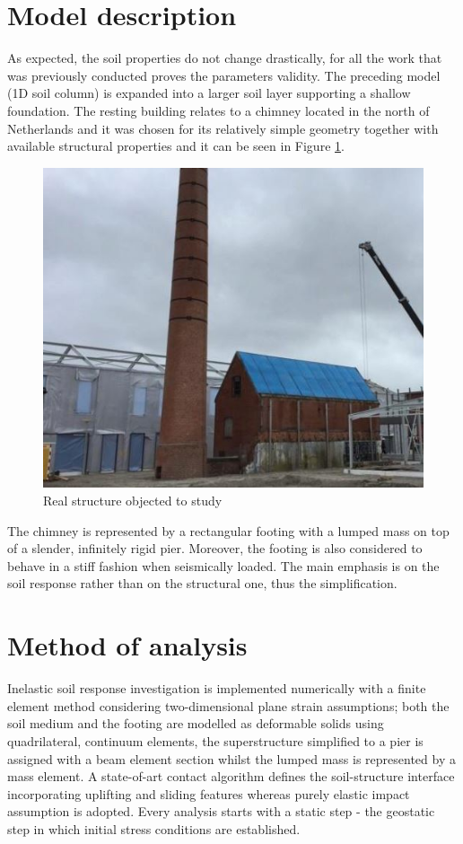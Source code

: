 	\section{Model description}
	As expected, the soil properties do not change drastically, for all the work that was previously conducted proves the parameters validity. The preceding model (1D soil column) is expanded into a larger soil layer supporting a shallow foundation. The resting building relates to a chimney located in the north of Netherlands and it was chosen for its relatively simple geometry together with available structural properties and it can be seen in Figure \ref{chimney}.
	\begin{figure}[!h]
		\centering
		\includegraphics[width=0.7 \linewidth]{"chimney"}
		\caption{Real structure objected to study}
		\label{chimney}
	\end{figure} 
	
	The chimney is represented by a rectangular footing with a lumped mass on top of a slender, infinitely rigid pier. Moreover, the footing is also considered to behave in a stiff fashion when seismically loaded. The main emphasis is on the soil response rather than on the structural one, thus the simplification.
	
\section{Method of analysis}
Inelastic soil response investigation is implemented numerically with a finite element method considering two-dimensional plane strain assumptions; both the soil medium and the footing are modelled as deformable solids using quadrilateral, continuum elements, the superstructure simplified to a pier is assigned with a beam element section whilst the lumped mass is represented by a mass element. A state-of-art contact algorithm defines the soil-structure interface incorporating uplifting and sliding features whereas purely elastic impact assumption is adopted. Every analysis starts with a static step - the geostatic step in which initial stress conditions are established.  


